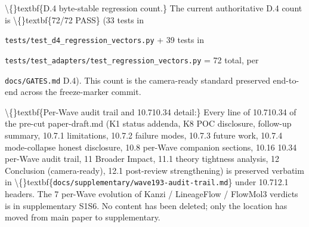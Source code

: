 \documentclass[preprint,3p,times,twocolumn]{elsarticle}
\begin{document}
\textbackslash\{\}textbf\{D.4 byte-stable regression count.\} The current authoritative D.4 count is \textbackslash\{\}textbf\{72/72 PASS\} (33 tests in

\texttt{tests/test\_d4\_regression\_vectors.py} + 39 tests in

\texttt{tests/test\_adapters/test\_regression\_vectors.py} = 72 total, per

\texttt{docs/GATES.md} D.4). This count is the camera-ready standard preserved end-to-end across the freeze-marker commit.

\textbackslash\{\}textbf\{Per-Wave audit trail and 10.710.34 detail:\} Every line of 10.710.34 of the pre-cut paper-draft.md (K1 status addenda, K8 POC disclosure, follow-up summary, 10.7.1 limitations, 10.7.2 failure modes, 10.7.3 future work, 10.7.4 mode-collapse honest disclosure, 10.8 per-Wave companion sections, 10.16 10.34 per-Wave audit trail, 11 Broader Impact, 11.1 theory tightness analysis, 12 Conclusion (camera-ready), 12.1 post-review strengthening) is preserved verbatim in \textbackslash\{\}textbf\{\texttt{docs/supplementary/wave193-audit-trail.md}\} under 10.712.1 headers. The 7 per-Wave evolution of Kanzi / LineageFlow / FlowMol3 verdicts is in supplementary S1S6. No content has been deleted; only the location has moved from main paper to supplementary.
\end{document}
